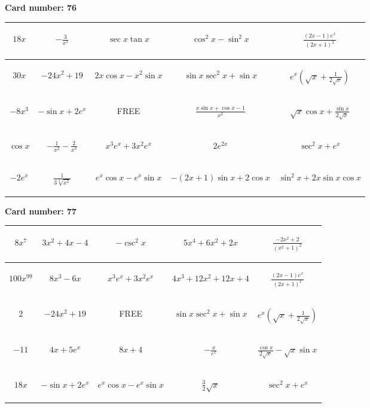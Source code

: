 \documentclass{article}
\newcommand{\entry}[1]{\begin{minipage}[t][2.75cm][t]{4cm} \vspace{1cm} \begin{center}#1\end{center} \end{minipage}}
\newcommand{\freespace}{\entry{FREE}}
\newcommand{\cardnumber}[1]{\noindent \textbf{Card number: #1} \bigskip}
\begin{document}
\pagebreak

\cardnumber{76}
\begin{center}
\begin{tabular}{|*{5}{c|}}
    \hline
    \entry{$18x$} & \entry{$-\frac{3}{x^2}$} & \entry{$\sec x \tan x$} & \entry{$\cos^2 x - \sin^2 x$} & \entry{$\frac{(2x - 1) e^x}{(2x + 1)^2}$} \\ \hline
    \entry{$30x$} & \entry{$-24x^2 + 19$} & \entry{$2x \cos x - x^2 \sin x$} & \entry{$\sin x \sec^2 x + \sin x$} & \entry{$e^x \left(\sqrt{x} + \frac{1}{2\sqrt{x}}\right)$} \\ \hline
    \entry{$-8x^3$} & \entry{$-\sin x + 2e^x$} & \freespace & \entry{$\frac{x \sin x + \cos x - 1}{x^2}$} & \entry{$\sqrt{x} \cos x + \frac{\sin x}{2 \sqrt{x}}$} \\ \hline
    \entry{$\cos x$} & \entry{$-\frac{1}{x^2} - \frac{2}{x^3}$} & \entry{$x^3 e^x + 3x^2 e^x$} & \entry{$2e^{2x}$} & \entry{$\sec^2 x + e^x$} \\ \hline
    \entry{$-2e^x$} & \entry{$\frac{1}{3\sqrt[3]{x^2}}$} & \entry{$e^x \cos x - e^x \sin x$} & \entry{$-(2x + 1) \sin x + 2 \cos x$} & \entry{$\sin^2 x + 2x \sin x \cos x$} \\ \hline
\end{tabular}
\end{center}

\pagebreak

\cardnumber{77}
\begin{center}
\begin{tabular}{|*{5}{c|}}
    \hline
    \entry{$8x^7$} & \entry{$3x^2 + 4x - 4$} & \entry{$-\csc^2 x$} & \entry{$5x^4 + 6x^2 + 2x$} & \entry{$\frac{-2x^2 + 2}{(x^2 + 1)^2}$} \\ \hline
    \entry{$100x^{99}$} & \entry{$8x^3 - 6x$} & \entry{$x^3 e^x + 3x^2 e^x$} & \entry{$4x^3 + 12x^2 + 12x + 4$} & \entry{$\frac{(2x - 1) e^x}{(2x + 1)^2}$} \\ \hline
    \entry{$2$} & \entry{$-24x^2 + 19$} & \freespace & \entry{$\sin x \sec^2 x + \sin x$} & \entry{$e^x \left(\sqrt{x} + \frac{1}{2\sqrt{x}}\right)$} \\ \hline
    \entry{$-11$} & \entry{$4x + 5e^x$} & \entry{$8x + 4$} & \entry{$-\frac{x}{e^x}$} & \entry{$\frac{\cos x}{2 \sqrt{x}} - \sqrt{x} \sin x$} \\ \hline
    \entry{$18x$} & \entry{$-\sin x + 2e^x$} & \entry{$e^x \cos x - e^x \sin x$} & \entry{$\frac{3}{2} \sqrt{x}$} & \entry{$\sec^2 x + e^x$} \\ \hline
\end{tabular}
\end{center}
\end{document}
